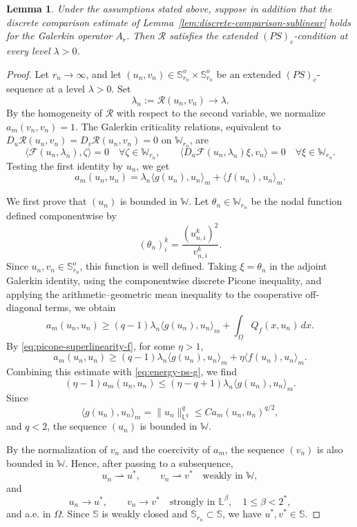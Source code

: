 \documentclass[10pt,a4paper]{amsart}
\newtheorem{lem}{Lemma}
\begin{document}
\begin{lem}\label{lem:PS-application}
	Under the assumptions stated above, suppose in addition that the discrete
	comparison estimate of Lemma~\ref{lem:discrete-comparison-sublinear}
	holds for the Galerkin operator \(A_r\). Then \(\mathcal R\) satisfies the
	extended \((PS)_e\)-condition at every level \(\lambda>0\).
\end{lem}

\begin{proof}
	Let \(r_n\to\infty\), and let
	\((u_n,v_n)\in\mathbb S_{r_n}^o\times\mathbb S_{r_n}^o\) be an extended
	\((PS)_e\)-sequence at a level \(\lambda>0\). Set
	\[
	\lambda_n:=\mathcal R(u_n,v_n)\to\lambda .
	\]
	By the homogeneity of \(\mathcal R\) with respect to the second variable,
	we normalize \(a_m(v_n,v_n)=1\). The Galerkin criticality relations,
	equivalent to \(D_u\mathcal R(u_n,v_n)=D_v\mathcal R(u_n,v_n)=0\) on
	\(\mathbb W_{r_n}\), are
	\[
	\langle\mathcal F(u_n,\lambda_n),\zeta\rangle=0
	\quad \forall \zeta\in\mathbb W_{r_n},
	\qquad
	\bigl\langle D_u\mathcal F(u_n,\lambda_n)\xi,v_n\bigr\rangle=0
	\quad \forall \xi\in\mathbb W_{r_n}.
	\]
	Testing the first identity by \(u_n\), we get
	\begin{equation}\label{eq:energy-ps-g}
		a_m(u_n,u_n)
		=
		\lambda_n\langle g(u_n),u_n\rangle_m
		+
		\langle f(u_n),u_n\rangle_m .
	\end{equation}
	
	We first prove that \((u_n)\) is bounded in \(\mathbb W\). Let
	\(\theta_n\in\mathbb W_{r_n}\) be the nodal function defined componentwise by
	\[
	(\theta_n)_i^k=\frac{(u_{n,i}^k)^2}{v_{n,i}^k}.
	\]
	Since \(u_n,v_n\in\mathbb S_{r_n}^o\), this function is well defined. Taking
	\(\xi=\theta_n\) in the adjoint Galerkin identity, using the componentwise
	discrete Picone inequality, and applying the arithmetic--geometric mean
	inequality to the cooperative off-diagonal terms, we obtain
	\[
	a_m(u_n,u_n)
	\ge
	(q-1)\lambda_n\langle g(u_n),u_n\rangle_m
	+
	\int_\Omega Q_f(x,u_n)\,dx .
	\]
	By \eqref{eq:picone-superlinearity-f}, for some \(\eta>1\),
	\[
	a_m(u_n,u_n)
	\ge
	(q-1)\lambda_n\langle g(u_n),u_n\rangle_m
	+
	\eta\langle f(u_n),u_n\rangle_m .
	\]
	Combining this estimate with \eqref{eq:energy-ps-g}, we find
	\[
	(\eta-1)a_m(u_n,u_n)
	\le
	(\eta-q+1)\lambda_n\langle g(u_n),u_n\rangle_m .
	\]
	Since
	\[
	\langle g(u_n),u_n\rangle_m
	=
	\|u_n\|_{\mathbb L^q}^q
	\le
	Ca_m(u_n,u_n)^{q/2},
	\]
	and \(q<2\), the sequence \((u_n)\) is bounded in \(\mathbb W\).
	
	By the normalization of \(v_n\) and the coercivity of \(a_m\), the sequence
	\((v_n)\) is also bounded in \(\mathbb W\). Hence, after passing to a
	subsequence,
	\[
	u_n\rightharpoonup u^*,
	\qquad
	v_n\rightharpoonup v^*
	\quad\text{weakly in }\mathbb W,
	\]
	and
	\[
	u_n\to u^*,
	\qquad
	v_n\to v^*
	\quad\text{strongly in }\mathbb L^\beta,\quad 1\le\beta<2^*,
	\]
	and a.e. in \(\Omega\). Since \(\mathbb S\) is weakly closed and
	\(\mathbb S_{r_n}\subset\mathbb S\), we have \(u^*,v^*\in\mathbb S\).
	

\end{proof}
\end{document}

